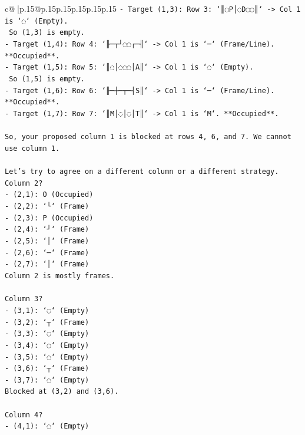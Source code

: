 \documentclass{article}
\begin{document}
{\begin{supertabular}{c@{$\;$}|p{.15\linewidth}@{}p{.15\linewidth}p{.15\linewidth}p{.15\linewidth}p{.15\linewidth}p{.15\linewidth}}
{{{\texttt{{-} Target (1,3): Row 3: `║◌P│◌D◌◌║` {-}> Col 1 is `◌` (Empty).} \\
\texttt{  So (1,3) is empty.} \\
\texttt{{-} Target (1,4): Row 4: `╟─┬┘◌◌┌─╢` {-}> Col 1 is `─` (Frame/Line). **Occupied**.} \\
\texttt{{-} Target (1,5): Row 5: `║◌│◌◌◌│A║` {-}> Col 1 is `◌` (Empty).} \\
\texttt{  So (1,5) is empty.} \\
\texttt{{-} Target (1,6): Row 6: `╟─┼─┬─┤S║` {-}> Col 1 is `─` (Frame/Line). **Occupied**.} \\
\texttt{{-} Target (1,7): Row 7: `║M│◌│◌│T║` {-}> Col 1 is `M`. **Occupied**.} \\
\\ 
\texttt{So, your proposed column 1 is blocked at rows 4, 6, and 7. We cannot use column 1.} \\
\\ 
\texttt{Let's try to agree on a different column or a different strategy. Column 2?} \\
\texttt{{-} (2,1): O (Occupied)} \\
\texttt{{-} (2,2): `└` (Frame)} \\
\texttt{{-} (2,3): P (Occupied)} \\
\texttt{{-} (2,4): `┘` (Frame)} \\
\texttt{{-} (2,5): `│` (Frame)} \\
\texttt{{-} (2,6): `─` (Frame)} \\
\texttt{{-} (2,7): `│` (Frame)} \\
\texttt{Column 2 is mostly frames.} \\
\\ 
\texttt{Column 3?} \\
\texttt{{-} (3,1): `◌` (Empty)} \\
\texttt{{-} (3,2): `┬` (Frame)} \\
\texttt{{-} (3,3): `◌` (Empty)} \\
\texttt{{-} (3,4): `◌` (Empty)} \\
\texttt{{-} (3,5): `◌` (Empty)} \\
\texttt{{-} (3,6): `┬` (Frame)} \\
\texttt{{-} (3,7): `◌` (Empty)} \\
\texttt{Blocked at (3,2) and (3,6).} \\
\\ 
\texttt{Column 4?} \\
\texttt{{-} (4,1): `◌` (Empty)} \\
}}}
\end{supertabular}}
\end{document}
